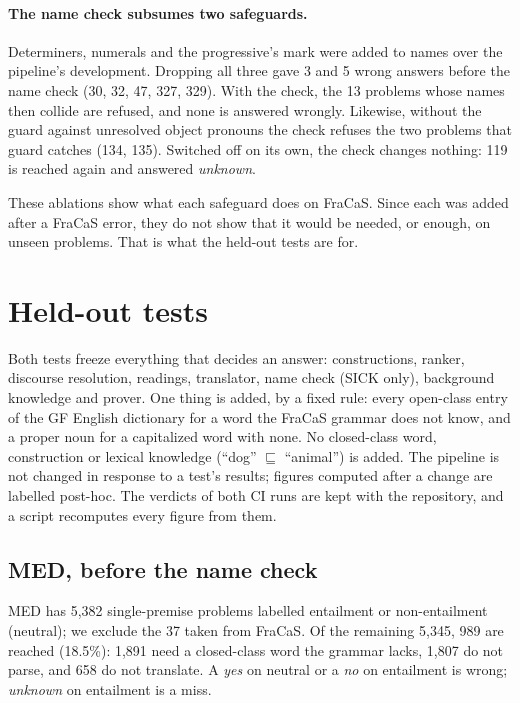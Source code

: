 \documentclass[11pt]{article}
\newcommand{\yes}{\textit{yes}}
\newcommand{\no}{\textit{no}}
\newcommand{\unk}{\textit{unknown}}
\begin{document}
\paragraph{The name check subsumes two safeguards.} Determiners,
numerals and the progressive's mark were added to names over the
pipeline's development. Dropping all three gave 3 and 5 wrong
answers before the name check (30, 32, 47, 327, 329). With the check, the
13 problems whose names then collide are refused, and none is answered
wrongly. Likewise, without the guard against unresolved object pronouns the
check refuses the two problems that guard catches (134, 135). Switched
off on its own, the check changes nothing: 119 is reached again and
answered \unk{}.

These ablations show what each safeguard does on FraCaS. Since each was
added after a FraCaS error, they do not show that it would be needed, or
enough, on unseen problems. That is what the held-out tests are for.

\section{Held-out tests}
\label{sec:heldout}

Both tests freeze everything that decides an answer: constructions,
ranker, discourse resolution, readings, translator, name check (SICK
only), background knowledge and prover. One thing is added, by a fixed
rule: every open-class entry of the GF English dictionary for a word the
FraCaS grammar does not know, and a proper noun for a capitalized word
with none. No closed-class word, construction or lexical knowledge
(``dog'' $\sqsubseteq$ ``animal'') is added. The pipeline is not changed
in response to a test's results; figures computed after a change are
labelled post-hoc. The verdicts of both CI runs are kept with the
repository, and a script recomputes every figure from them.

\subsection{MED, before the name check}

MED \citep{yanaka-etal-2019-neural} has 5,382 single-premise problems
labelled entailment or non-entailment (neutral); we exclude the 37 taken from FraCaS. Of
the remaining 5,345, 989 are reached (18.5\%): 1,891 need a closed-class
word the grammar lacks, 1,807 do not parse, and 658 do not translate. A
\yes{} on neutral or a \no{} on entailment is wrong; \unk{} on
entailment is a miss.
\end{document}
